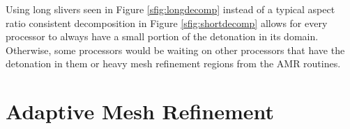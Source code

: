 Using long slivers seen in Figure \ref{sfig:longdecomp} instead of a typical aspect ratio consistent decomposition in Figure \ref{sfig:shortdecomp} allows for every processor to always have a small portion of the detonation in its domain. Otherwise, some processors would be waiting on other processors that have the detonation in them or heavy mesh refinement regions from the AMR routines.




\section{Adaptive Mesh Refinement}

